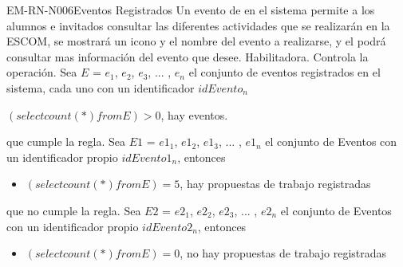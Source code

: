 \begin{BussinesRule}{EM-RN-N006}{Eventos Registrados}
	\BRitem[Descripción:]Un evento de en el sistema permite a los alumnos e invitados consultar las diferentes actividades que se realizarán en la ESCOM, se mostrará un icono y el nombre del evento a realizarse, y el podrá consultar mas información del evento que desee. 
	\BRitem[Tipo:] Habilitadora.
	\BRitem[Nivel:] Controla la operación.
	\BRitem[Sentencia: ] Sea $E$ = {$e_{1}$, $e_{2}$, $e_{3}$, ... , $e_{n}$} el conjunto de eventos registrados en el sistema, cada uno con un identificador $idEvento_{n}$  
	\begin{center}
		$(select count(*) from E) > 0$, hay eventos.
	\end{center}
	
	 que cumple la regla.
		Sea $E1$ = {$e1_{1}$, $e1_{2}$, $e1_{3}$, ... , $e1_{n}$} el conjunto de Eventos con un identificador propio $idEvento1_{n}$, entonces 
		\begin{itemize}
			\item $(select count(*) from E) = 5$, hay propuestas de trabajo registradas 
			
		\end{itemize}
	 que no cumple la regla.
		Sea $E2$ = {$e2_{1}$, $e2_{2}$, $e2_{3}$, ... , $e2_{n}$} el conjunto de Eventos con un identificador propio $idEvento2_{n}$, entonces 
		\begin{itemize}
			\item $(select count(*) from E) = 0$, no hay propuestas de trabajo registradas 
			
		\end{itemize}
\end{BussinesRule}

